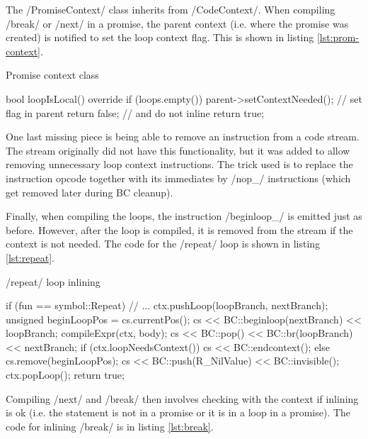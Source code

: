 The \cppinline/PromiseContext/ class inherits from \cppinline/CodeContext/. When compiling \rinline/break/ or \rinline/next/ in a promise, the parent context (i.e. where the promise was created) is notified to set the loop context flag. This is shown in listing \ref{lst:prom-context}.

\begin{listing}[htbp]
  \caption{\label{lst:prom-context}Promise context class}
  \begin{cppcode}
bool loopIsLocal() override {
    if (loops.empty()) {
        parent->setContextNeeded();  // set flag in parent
        return false;  // and do not inline
    }
    return true;
}
  \end{cppcode}
\end{listing}

One last missing piece is being able to remove an instruction from a code stream. The stream originally did not have this functionality, but it was added to allow removing unnecessary loop context instructions. The trick used is to replace the instruction opcode together with its immediates by \cinline/nop_/ instructions (which get removed later during BC cleanup).

Finally, when compiling the loops, the instruction \cinline/beginloop_/ is emitted just as before. However, after the loop is compiled, it is removed from the stream if the context is not needed. The code for the \rinline/repeat/ loop is shown in listing \ref{lst:repeat}.

\begin{listing}[htbp]
  \caption{\label{lst:repeat}\rinline/repeat/ loop inlining}
  \begin{cppcode}
if (fun == symbol::Repeat) {
    // ...
    ctx.pushLoop(loopBranch, nextBranch);
    unsigned beginLoopPos = cs.currentPos();
    cs << BC::beginloop(nextBranch)
       << loopBranch;
    compileExpr(ctx, body);
    cs << BC::pop() << BC::br(loopBranch)
       << nextBranch;
    if (ctx.loopNeedsContext())
        cs << BC::endcontext();
    else
        cs.remove(beginLoopPos);
    cs << BC::push(R_NilValue) << BC::invisible();
    ctx.popLoop();
    return true;
}
  \end{cppcode}
\end{listing}

Compiling \rinline/next/ and \rinline/break/ then involves checking with the context if inlining is ok (i.e. the statement is not in a promise or it is in a loop in a promise). The code for inlining \rinline/break/ is in listing \ref{lst:break}.


